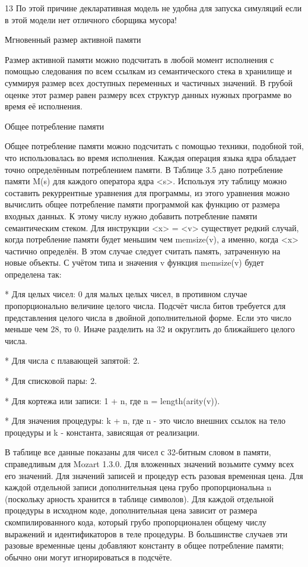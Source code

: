 13 По этой причине декларативная модель не удобна для запуска симуляций если в этой модели нет отличного сборщика мусора!

Мгновенный размер активной памяти

Размер активной памяти можно подсчитать в любой момент исполнения с помощью следования по всем ссылкам из семантического стека в хранилище и суммируя размер всех доступных переменных и частичных значений. В грубой оценке этот размер равен размеру всех структур данных нужных программе во время её исполнения.

Общее потребление памяти

Общее потребление памяти можно подсчитать с помощью техники, подобной той, что использовалась во время исполнения. Каждая операция языка ядра обладает точно определённым потреблением памяти. В Таблице 3.5 дано потребление памяти M(s) для каждого оператора ядра <s>. Используя эту таблицу можно составить рекуррентные уравнения для программы, из этого уравнения можно вычислить общее потребление памяти программой как функцию от размера входных данных. К этому числу нужно добавить потребление памяти семантическим стеком. Для инструкции <x> = <v> существует редкий случай, когда потребление памяти будет меньшим чем memsize(v), а именно, когда <x> частично определён. В этом случае следует считать память, затраченную на новые объекты. С учётом типа и значения v функция memsize(v) будет определена так:

* Для целых чисел: 0 для малых целых чисел, в противном случае пропорционально величине целого числа. Подсчёт числа битов требуется для представления целого числа в двойной дополнительной форме. Если это число меньше чем 28, то 0. Иначе разделить на 32 и округлить до ближайшего целого числа.

* Для числа с плавающей запятой: 2.

* Для списковой пары: 2.

* Для кортежа или записи: 1 + n, где n = length(arity(v)).

* Для значения процедуры: k + n, где n - это число внешних ссылок на тело процедуры и k - константа, зависящая от реализации.

В таблице все данные показаны для чисел с 32-битным словом в памяти, справедливым для Mozart 1.3.0. Для вложенных значений возьмите сумму всех его значений. Для значений записей и процедур есть разовая временная цена. Для каждой отдельной записи дополнительная цена грубо пропорциональна n (поскольку арность хранится в таблице символов). Для каждой отдельной процедуры в исходном коде, дополнительная цена зависит от размера скомпилированного кода, который грубо пропорционален общему числу выражений и идентификаторов в теле процедуры. В большинстве случаев эти разовые временные цены добавляют константу в общее потребление памяти; обычно они могут игнорироваться в подсчёте.

